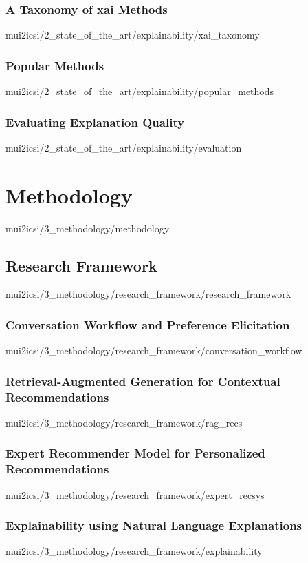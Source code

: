 \documentclass[english,epsbased,copyright,final,printable,covers,extendedindex,firstnumbered,tfm,gnuplot,loc,loe,lof,lot]{tfgtfmthesisuam}
\begin{document}
      \subsection{A Taxonomy of \acs{xai} Methods\label{SS:XAITAXONOMY}}{mui2icsi/2_state_of_the_art/explainability/xai_taxonomy}
      \subsection{Popular Methods\label{SS:POPMETHODS}}{mui2icsi/2_state_of_the_art/explainability/popular_methods}
      \subsection{Evaluating Explanation Quality\label{SS:EVALEXPLAIN}}{mui2icsi/2_state_of_the_art/explainability/evaluation}

  \chapter{Methodology\label{CAP:METHODOLOGY}}{mui2icsi/3_methodology/methodology}
    \section{Research Framework\label{SEC:RESEARCHFW}}{mui2icsi/3_methodology/research_framework/research_framework}
      \subsection{Conversation Workflow and Preference Elicitation\label{SS:CONVPREF}}{mui2icsi/3_methodology/research_framework/conversation_workflow}
      \subsection{Retrieval-Augmented Generation for Contextual Recommendations\label{SS:RAGRECS}}{mui2icsi/3_methodology/research_framework/rag_recs}
      \subsection{Expert Recommender Model for Personalized Recommendations\label{SS:EXPERTRECSYS}}{mui2icsi/3_methodology/research_framework/expert_recsys}
      \subsection{Explainability using Natural Language Explanations\label{SS:EXPLAINNLE}}{mui2icsi/3_methodology/research_framework/explainability}
\end{document}
